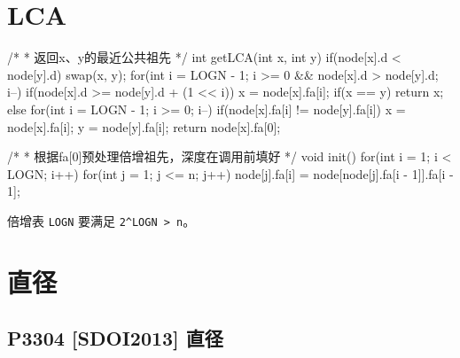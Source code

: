 \section{LCA}
\begin{codeline}
/*
 * 返回x、y的最近公共祖先
 */
int getLCA(int x, int y) {
    if(node[x].d < node[y].d) {
        swap(x, y);
    }
    for(int i = LOGN - 1; i >= 0 && node[x].d > node[y].d; i--) {
        if(node[x].d >= node[y].d + (1 << i)) {
            x = node[x].fa[i];
        }
    }
    if(x == y) {
        return x;
    } else {
        for(int i = LOGN - 1; i >= 0; i--) {
            if(node[x].fa[i] != node[y].fa[i]) {
                x = node[x].fa[i];
                y = node[y].fa[i];
            }
        }
        return node[x].fa[0];
    }
}

/*
 * 根据fa[0]预处理倍增祖先，深度在调用前填好
 */
void init() {
    for(int i = 1; i < LOGN; i++) {
        for(int j = 1; j <= n; j++) {
            node[j].fa[i] = node[node[j].fa[i - 1]].fa[i - 1];
        }
    }
}
\end{codeline}
\begin{warnbox}
倍增表 \texttt{LOGN} 要满足 \texttt{2\textasciicircum{}LOGN \textgreater{} n}。
\end{warnbox}

\section{直径}
\subsection{P3304 {[}SDOI2013{]} 直径}\label{p3304-sdoi2013-ux76f4ux5f84}


